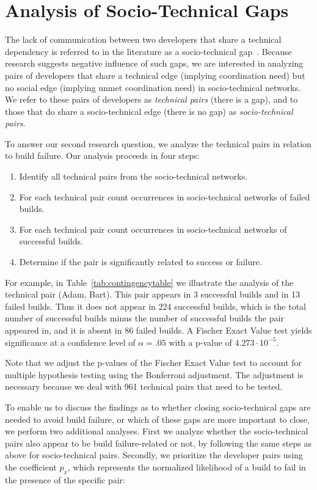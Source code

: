 \section{Analysis of Socio-Technical Gaps}
The lack of communication between two developers that share a
technical dependency is referred to in the literature as a
socio-technical gap~\cite{valetto:msr:2007}. Because research suggests negative influence of such gaps, we are interested in analyzing pairs of developers that share a technical edge (implying coordination need) but no social edge (implying
unmet coordination need) in socio-technical networks. We refer to these pairs of
developers as \emph{technical pairs} (there is a gap), and to those that do
share a socio-technical edge (there is no gap) as \emph{socio-technical pairs}. 

To answer our second research question, we analyze the
technical pairs in relation to build
failure. Our analysis proceeds in four steps:

\begin{enumerate}
\item Identify all technical pairs from the socio-technical networks.
\item For each technical pair count occurrences in socio-technical networks of
failed builds.
\item For each technical pair count occurrences in socio-technical networks of
successful builds.
\item Determine if the pair is significantly related to success or failure.
\end{enumerate}

For example, in Table~\ref{tab:contingencytable} we illustrate the analysis of
the technical pair (Adam, Bart). This pair appears in 3 successful builds and in
13 failed builds. Thus it does not appear in 224 successful builds, which is the total number of successful builds minus the number of successful builds the pair appeared in, and it is absent in 86 failed builds.
A Fischer Exact Value test yields significance at a confidence level of $\alpha = .05$ with a p-value of $4.273\cdot10^{-5}$.

Note that we adjust the p-values of the Fischer Exact Value test to account for multiple hypothesis testing using the Bonferroni adjustment.
The adjustment is necessary because we deal with 961 technical pairs that need to be tested. 

To enable us to discuss the findings as to whether closing socio-technical gaps
are needed to avoid build failure, or which of these gaps are more important to
close, we perform two additional analyses. 
First we analyze whether the
socio-technical pairs also appear to be build failure-related or not, by
following the same steps as above for socio-technical pairs. 
%
Secondly, we prioritize the developer pairs using the coefficient $p_x$,
which represents the normalized likelihood of a build
to fail in the presence of the specific pair:

